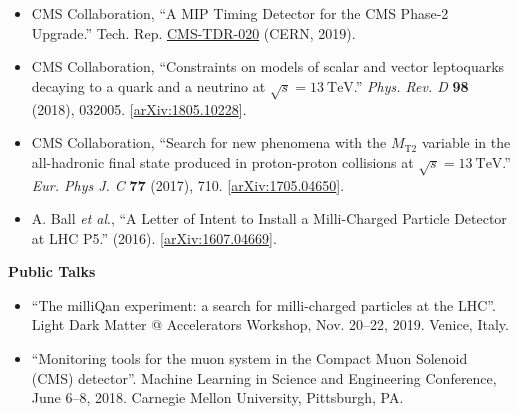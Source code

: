\begin{vitae}
\begin{flushleft}
\begin{itemize}
\item CMS Collaboration, ``A MIP Timing Detector for the CMS Phase-2 Upgrade.''
Tech. Rep. \href{https://cds.cern.ch/record/2667167?ln=en}{CMS-TDR-020} (CERN, 2019).

\item CMS Collaboration, ``Constraints on models of scalar and vector leptoquarks decaying to a quark
  and a neutrino at $\sqrt{s}=13~\mathrm{TeV}$.'' \textit{Phys. Rev. D}
  \textbf{98} (2018), 032005. 
  [\href{https://arxiv.org/abs/1805.10228}{arXiv:1805.10228}].

\item CMS Collaboration, ``Search for new phenomena with the $M_\mathrm{T2}$ variable in the all-hadronic
  final state produced in proton-proton collisions at $\sqrt{s}=13~\mathrm{TeV}$.'' \textit{Eur. Phys J. C}
  \textbf{77} (2017), 710.
  [\href{https://arxiv.org/abs/1705.04650}{arXiv:1705.04650}].

\item A. Ball \textit{et al}., ``A Letter of Intent to Install a Milli-Charged Particle Detector at LHC P5.'' (2016).
  [\href{https://arxiv.org/abs/1607.04669}{arXiv:1607.04669}].

\end{itemize}


\vspace{4mm}
\textbf{Public Talks}
\vspace{-1mm}

\begin{itemize}\setlength\itemsep{2mm}

\item ``The milliQan experiment: a search for milli-charged particles at the LHC''.
Light Dark Matter @ Accelerators Workshop, Nov. 20--22, 2019. Venice, Italy.

\item ``Monitoring tools for the muon system in the Compact Muon Solenoid (CMS) detector''.
Machine Learning in Science and Engineering Conference, June 6--8, 2018. Carnegie Mellon
University, Pittsburgh, PA.

\end{itemize}

\end{flushleft}

\end{vitae}
